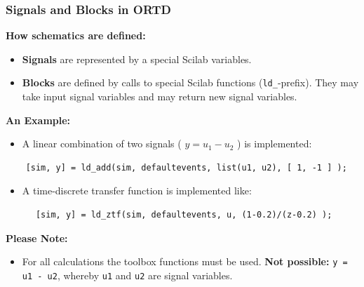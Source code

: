 \documentclass[serif,9pt,xcolor=dvipsnames]{beamer}
\begin{document}
\begin{frame}[fragile]
    \frametitle{Signals and Blocks in ORTD}

\textbf{How schematics are defined:}

  \begin{itemize}
  \item \textbf{Signals} are represented by a special Scilab variables.
  \item \textbf{Blocks} are defined by calls to special Scilab functions (\texttt{ld\_}-prefix). They may take input signal variables and may return new signal variables.
  \end{itemize}

\textbf{An Example:}
  \begin{itemize}
  \item A linear combination of two signals ( $y=u_1 - u_2$ ) is implemented:
  \end{itemize}

  {\small 
  \begin{lstlisting}
    [sim, y] = ld_add(sim, defaultevents, list(u1, u2), [ 1, -1 ] );
  \end{lstlisting}}
    

  \begin{itemize}
  \item A time-discrete transfer function is implemented like:
  \end{itemize}

  {\small 
  \begin{lstlisting} 
      [sim, y] = ld_ztf(sim, defaultevents, u, (1-0.2)/(z-0.2) );
  \end{lstlisting}}

\textbf{Please Note:}
  \begin{itemize}
  \item For all calculations the toolbox functions must be used. \textbf{Not possible:} \texttt{y = u1 - u2}, whereby \texttt{u1} and \texttt{u2} are signal variables.
  \end{itemize}
  


\end{frame}
\end{document}
